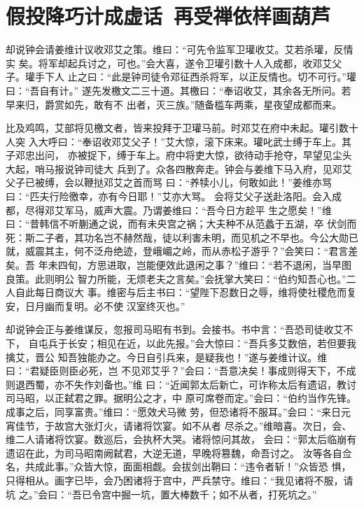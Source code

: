 \chapter{假投降巧计成虚话~再受禅依样画葫芦}

却说钟会请姜维计议收邓艾之策。维曰：“可先令监军卫瓘收艾。艾若杀瓘，反情实
矣。将军却起兵讨之，可也。”会大喜，遂令卫瓘引数十人入成都，收邓艾父子。瓘手下人
止之曰：“此是钟司徒令邓征西杀将军，以正反情也。切不可行。”瓘曰：“吾自有计。”
遂先发檄文二三十道。其檄曰：“奉诏收艾，其余各无所问。若早来归，爵赏如先，敢有不
出者，灭三族。”随备槛车两乘，星夜望成都而来。

比及鸡鸣，艾部将见檄文者，皆来投拜于卫瓘马前。时邓艾在府中未起。瓘引数十人突
入大呼曰：“奉诏收邓艾父子！”艾大惊，滚下床来。瓘叱武士缚于车上。其子邓忠出问，
亦被捉下，缚于车上。府中将吏大惊，欲待动手抢夺，早望见尘头大起，哨马报说钟司徒大
兵到了。众各四散奔走。钟会与姜维下马入府，见邓艾父子已被缚，会以鞭挞邓艾之首而骂
曰：“养犊小儿，何敢如此！”姜维亦骂曰：“匹夫行险徼幸，亦有今日耶！”艾亦大骂。
会将艾父子送赴洛阳。会入成都，尽得邓艾军马，威声大震。乃谓姜维曰：“吾今日方趁平
生之愿矣！”维曰：“昔韩信不听蒯通之说，而有未央宫之祸；大夫种不从范蠡于五湖，卒
伏剑而死：斯二子者，其功名岂不赫然哉，徒以利害未明，而见机之不早也。今公大勋已
就，威震其主，何不泛舟绝迹，登峨嵋之岭，而从赤松子游乎？”会笑曰：“君言差矣。吾
年未四旬，方思进取，岂能便效此退闲之事？”维曰：“若不退闲，当早图良策。此则明公
智力所能，无烦老夫之言矣。”会抚掌大笑曰：“伯约知吾心也。”二人自此每日商议大
事。维密与后主书曰：“望陛下忍数日之辱，维将使社稷危而复安，日月幽而复明。必不使
汉室终灭也。”

却说钟会正与姜维谋反，忽报司马昭有书到。会接书。书中言：“吾恐司徒收艾不下，
自屯兵于长安；相见在近，以此先报。”会大惊曰：“吾兵多艾数倍，若但要我擒艾，晋公
知吾独能办之。今日自引兵来，是疑我也！”遂与姜维计议。维曰：“君疑臣则臣必死，岂
不见邓艾乎？”会曰：“吾意决矣！事成则得天下，不成则退西蜀，亦不失作刘备也。”维
曰：“近闻郭太后新亡，可诈称太后有遗诏，教讨司马昭，以正弑君之罪。据明公之才，中
原可席卷而定。”会曰：“伯约当作先锋。成事之后，同享富贵。”维曰：“愿效犬马微
劳，但恐诸将不服耳。”会曰：“来日元宵佳节，于故宫大张灯火，请诸将饮宴。如不从者
尽杀之。”维暗喜。次日，会、维二人请诸将饮宴。数巡后，会执杯大哭。诸将惊问其故，
会曰：“郭太后临崩有遗诏在此，为司马昭南阙弑君，大逆无道，早晚将篡魏，命吾讨之。
汝等各自佥名，共成此事。”众皆大惊，面面相觑。会拔剑出鞘曰：“违令者斩！”众皆恐
惧，只得相从。画字已毕，会乃困诸将于宫中，严兵禁守。维曰：“我见诸将不服，请坑
之。”会曰：“吾已令宫中掘一坑，置大棒数千；如不从者，打死坑之。”

